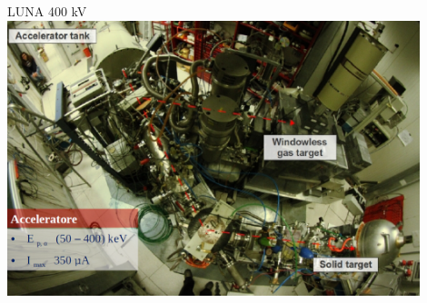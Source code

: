 \documentclass [xcolor=svgnames, 9pt] {beamer}
\begin{document}
	
\begin{frame}{LUNA 400 kV}%
	\centering
	\includegraphics[width=0.9\textwidth]{img/LUNA2.png}
\end{frame}

%				
%				 
%				
%				
\end{document}
